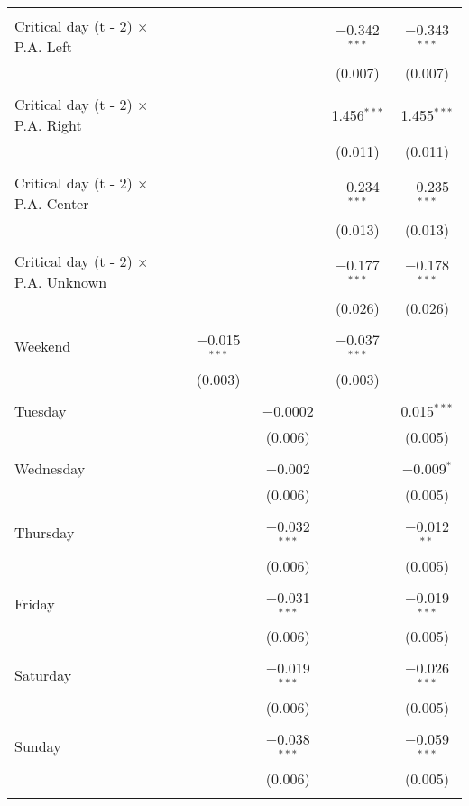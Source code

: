 \documentclass[
]{article}
\begin{document}
\begin{table}[!htbp]
{\begin{tabular}{@{\extracolsep{5pt}}lcccc}
  & & & & \\ 
 Critical day (t - 2) $\times$ P.A. Left &  &  & $-$0.342$^{***}$ & $-$0.343$^{***}$ \\ 
  &  &  & (0.007) & (0.007) \\ 
  & & & & \\ 
 Critical day (t - 2) $\times$ P.A. Right &  &  & 1.456$^{***}$ & 1.455$^{***}$ \\ 
  &  &  & (0.011) & (0.011) \\ 
  & & & & \\ 
 Critical day (t - 2) $\times$ P.A. Center &  &  & $-$0.234$^{***}$ & $-$0.235$^{***}$ \\ 
  &  &  & (0.013) & (0.013) \\ 
  & & & & \\ 
 Critical day (t - 2) $\times$ P.A. Unknown &  &  & $-$0.177$^{***}$ & $-$0.178$^{***}$ \\ 
  &  &  & (0.026) & (0.026) \\ 
  & & & & \\ 
 Weekend & $-$0.015$^{***}$ &  & $-$0.037$^{***}$ &  \\ 
  & (0.003) &  & (0.003) &  \\ 
  & & & & \\ 
 Tuesday &  & $-$0.0002 &  & 0.015$^{***}$ \\ 
  &  & (0.006) &  & (0.005) \\ 
  & & & & \\ 
 Wednesday &  & $-$0.002 &  & $-$0.009$^{*}$ \\ 
  &  & (0.006) &  & (0.005) \\ 
  & & & & \\ 
 Thursday &  & $-$0.032$^{***}$ &  & $-$0.012$^{**}$ \\ 
  &  & (0.006) &  & (0.005) \\ 
  & & & & \\ 
 Friday &  & $-$0.031$^{***}$ &  & $-$0.019$^{***}$ \\ 
  &  & (0.006) &  & (0.005) \\ 
  & & & & \\ 
 Saturday &  & $-$0.019$^{***}$ &  & $-$0.026$^{***}$ \\ 
  &  & (0.006) &  & (0.005) \\ 
  & & & & \\ 
 Sunday &  & $-$0.038$^{***}$ &  & $-$0.059$^{***}$ \\ 
  &  & (0.006) &  & (0.005) \\ 
  & & & & \\ 

\end{tabular}}
\end{table}
\end{document}
